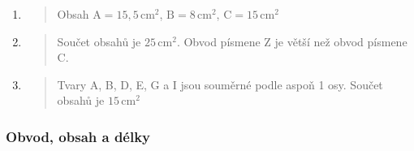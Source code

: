 \begin{enumerate}
    \item
    \begin{quote}
        Obsah $\text{A} = 15,5\,\text{cm}^2$, $\text{B} = 8\,\text{cm}^2$, $\text{C} = 15\,\text{cm}^2$
    \end{quote}

    \item
    \begin{quote}
        Součet obsahů je $25\,\text{cm}^2$.
        Obvod písmene Z je větší než obvod písmene C\@.
    \end{quote}

    \item
    \begin{quote}
        Tvary A, B, D, E, G a I jsou souměrné podle aspoň 1 osy.
        Součet obsahů je $15\,\text{cm}^2$
    \end{quote}

\end{enumerate}

\newpage

\subsubsection{Obvod, obsah a délky}

